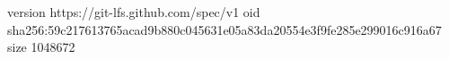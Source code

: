version https://git-lfs.github.com/spec/v1
oid sha256:59c217613765acad9b880c045631e05a83da20554e3f9fe285e299016c916a67
size 1048672
